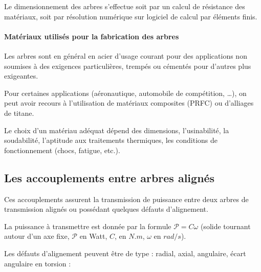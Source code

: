 \documentclass[11pt,oneside]{article}
\begin{document}
Le dimensionnement des arbres s’effectue soit par un calcul de résistance des matériaux, soit par résolution numérique sur logiciel de calcul par éléments finis.

\paragraph*{Matériaux utilisés pour la fabrication des arbres}
Les arbres sont en général en acier d’usage courant pour des applications non soumises à des exigences particulières, trempés ou cémentés pour d’autres plus exigeantes. 

Pour certaines applications (aéronautique, automobile de compétition, …), on peut avoir recours à l’utilisation de matériaux composites (PRFC) ou d’alliages de titane.

Le choix d’un matériau adéquat dépend des dimensions, l’usinabilité, la soudabilité, l’aptitude aux traitements thermiques, les conditions de fonctionnement (chocs, fatigue, etc.).

\subsection{Les accouplements entre arbres alignés}

Ces accouplements assurent la transmission de puissance entre deux arbres de transmission alignés ou possédant quelques défauts d’alignement.

La puissance à transmettre est donnée par la formule $\mathcal{P}=C\omega$  (solide tournant autour d’un axe fixe, $\mathcal{P}$ en Watt, $C$, en $N.m$, $\omega$ en $rad/s$).

Les défauts d’alignement peuvent être de type : radial, axial, angulaire, écart angulaire en torsion :
\end{document}
